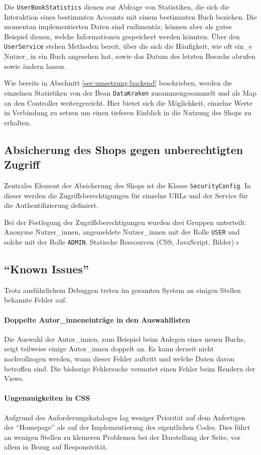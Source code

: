 	Die \texttt{UserBookStatistics} dienen zur Abfrage von Statistiken, die sich die Interaktion eines bestimmten Accounts mit einem bestimmten Buch beziehen. Die momentan implementierten Daten sind rudimentär, können aber als gutes Beispiel dienen, welche Informationen gespeichert werden könnten. Über den \texttt{UserService} stehen Methoden bereit, über die sich die Häufigkeit, wie oft ein\_e Nutzer\_in ein Buch angesehen hat, sowie das Datum des letzten Besuchs abrufen sowie ändern lassen.
	
	Wie bereits in Abschnitt \ref{sec:umsetzung:backend} beschrieben, werden die einzelnen Statistiken von der Bean \lstinline|DataKraken| zusammengesammelt und als Map an den Controller weitergereicht. Hier bietet sich die Möglichkeit, einzelne Werte in Verbindung zu setzen um einen tieferen Einblick in die Nutzung des Shops zu erhalten.
	
	\subsection{Absicherung des Shops gegen unberechtigten Zugriff}
	Zentrales Element der Absicherung des Shops ist die Klasse \lstinline|SecurityConfig|. In dieser werden die Zugriffsberechtigungen für einzelne URLs und der Service für die Authentifizierung definiert.
	
	Bei der Festlegung der Zugriffsberechtigungen wurden drei Gruppen unterteilt: Anonyme Nutzer\_innen, angemeldete Nutzer\_innen mit der Rolle \lstinline|USER| und solche mit der Rolle \lstinline|ADMIN|. Statische Ressourcen (CSS, JavaScript, Bilder) s
		
	\subsection{"`Known Issues"'}
	Trotz ausführlichem Debuggen treten im gesamten System an einigen Stellen bekannte Fehler auf.
	
		\paragraph{Doppelte Autor\_inneneinträge in den Auswahllisten}
		Die Auswahl der Autor\_innen, zum Beispiel beim Anlegen eines neuen Buchs, zeigt teilweise einige Autor\_innen doppelt an. Es kann derzeit nicht nachvollzogen werden, wann dieser Fehler auftritt und welche Daten davon betroffen sind. Die bisherige Fehlersuche vermutet einen Fehler beim Rendern der Views.
		
		\paragraph{Ungenauigkeiten in CSS}
		Aufgrund des Anforderungskataloges lag weniger Priorität auf dem Anfertigen der "`Homepage"' als auf der Implementierung des eigentlichen Codes. Dies führt an wenigen Stellen zu kleineren Problemen bei der Darstellung der Seite, vor allem in Bezug auf Responsivität.
	
